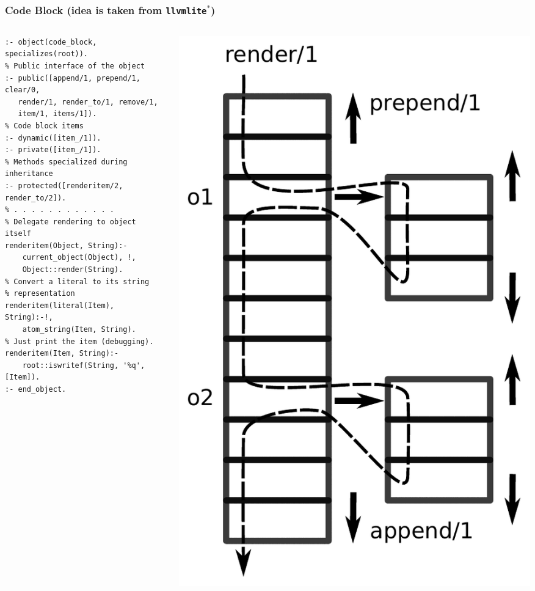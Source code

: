 \documentclass[10pt]{beamer}
\begin{document}
\begin{frame}[fragile]
  \frametitle{Code Block (idea is taken from \texttt{llvmlite}${}^*$)}
  \begin{columns}
    \begin{column}{0.6\textwidth}
      \flushleft
\begin{verbatim}
:- object(code_block, specializes(root)).
% Public interface of the object
:- public([append/1, prepend/1, clear/0,
   render/1, render_to/1, remove/1,
   item/1, items/1]).
% Code block items
:- dynamic([item_/1]).
:- private([item_/1]).
% Methods specialized during inheritance
:- protected([renderitem/2, render_to/2]).
% . . . . . . . . . . . .
% Delegate rendering to object itself
renderitem(Object, String):-
    current_object(Object), !,
    Object::render(String).
% Convert a literal to its string
% representation
renderitem(literal(Item), String):-!,
    atom_string(Item, String).
% Just print the item (debugging).
renderitem(Item, String):-
    root::iswritef(String, '%q', [Item]).
:- end_object.
\end{verbatim}
    \end{column}
    \begin{column}{0.4\textwidth}
      \includegraphics[width=1\linewidth]{code_block.pdf}

\end{column}
\end{columns}
\end{frame}
\end{document}

